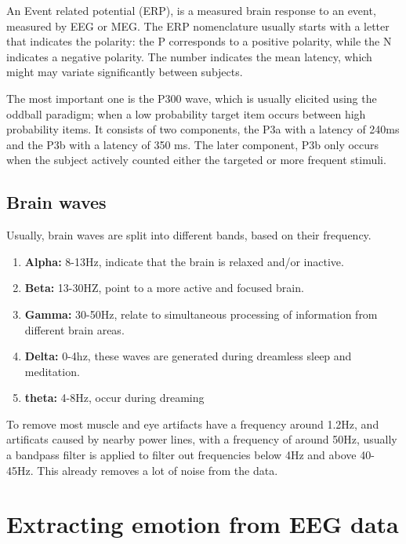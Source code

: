 \npar

An Event related potential (ERP), is a measured brain response to an event, measured by EEG or MEG. The ERP nomenclature usually starts with a letter that indicates the polarity: the P corresponds to a positive polarity, while the N indicates a negative polarity. The number indicates the mean latency, which might may variate significantly between subjects.

\npar

The most important one is the P300 wave, which is usually elicited using the oddball paradigm; when a low probability target item occurs between high probability items. It consists of two components, the P3a with a latency of 240ms and the P3b with a latency of 350 ms\cite{P300TwoParts}. The later component, P3b only occurs when the subject actively counted either the targeted or more frequent stimuli.


\clearpage

\subsection{Brain waves}
Usually, brain waves are split into different bands, based on their frequency\cite{EmotionRelativePower}\cite{WavesSite}.
\begin{enumerate}
\item \textbf{Alpha:} 8-13Hz, indicate that the brain is relaxed and/or inactive.
\item \textbf{Beta:} 13-30HZ, point to a more active and focused brain.
\item \textbf{Gamma:} 30-50Hz, relate to simultaneous processing of information from different brain areas.
\item \textbf{Delta:} 0-4hz, these waves are generated during dreamless sleep and meditation.
\item \textbf{theta:} 4-8Hz, occur during dreaming
\end{enumerate}
To remove most muscle and eye artifacts have a frequency around 1.2Hz, and artificats caused by nearby power lines, with a frequency of around 50Hz\cite{ExtendedPaper}, usually a bandpass filter is applied to filter out frequencies below 4Hz and above 40-45Hz. This already removes a lot of noise from the data.

\section{Extracting emotion from EEG data}

